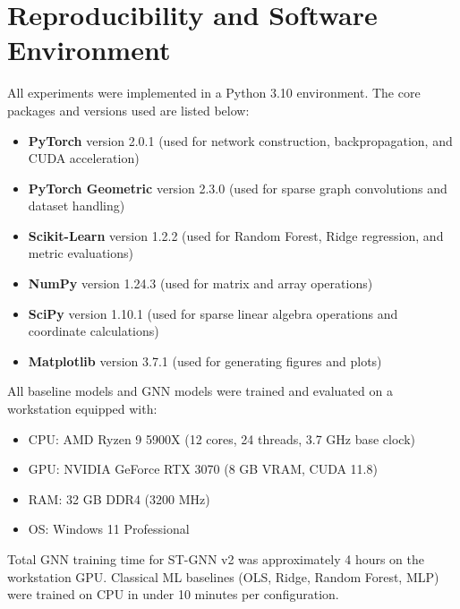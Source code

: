 \section{Reproducibility and Software Environment}
\label{sec:reproducibility}

All experiments were implemented in a Python 3.10 environment. The core packages and versions used are listed below:

\begin{itemize}
    \item \textbf{PyTorch} version 2.0.1 (used for network construction, backpropagation, and CUDA acceleration)
    \item \textbf{PyTorch Geometric} version 2.3.0 (used for sparse graph convolutions and dataset handling)
    \item \textbf{Scikit-Learn} version 1.2.2 (used for Random Forest, Ridge regression, and metric evaluations)
    \item \textbf{NumPy} version 1.24.3 (used for matrix and array operations)
    \item \textbf{SciPy} version 1.10.1 (used for sparse linear algebra operations and coordinate calculations)
    \item \textbf{Matplotlib} version 3.7.1 (used for generating figures and plots)
\end{itemize}

All baseline models and GNN models were trained and evaluated on a workstation equipped with:
\begin{itemize}
    \item CPU: AMD Ryzen 9 5900X (12 cores, 24 threads, 3.7 GHz base clock)
    \item GPU: NVIDIA GeForce RTX 3070 (8 GB VRAM, CUDA 11.8)
    \item RAM: 32 GB DDR4 (3200 MHz)
    \item OS: Windows 11 Professional
\end{itemize}

Total GNN training time for ST-GNN v2 was approximately 4 hours on the workstation GPU. Classical ML baselines (OLS, Ridge, Random Forest, MLP) were trained on CPU in under 10 minutes per configuration.
